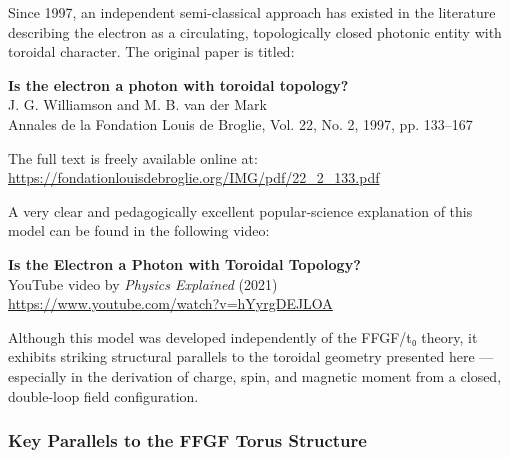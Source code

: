 Since 1997, an independent semi-classical approach has existed in the literature describing the electron as a circulating, topologically closed photonic entity with toroidal character. The original paper is titled:

\begin{center}
	\textbf{Is the electron a photon with toroidal topology?} \\
	J. G. Williamson and M. B. van der Mark \\
	Annales de la Fondation Louis de Broglie, Vol. 22, No. 2, 1997, pp. 133--167
\end{center}

The full text is freely available online at: \\
\url{https://fondationlouisdebroglie.org/IMG/pdf/22_2_133.pdf}

A very clear and pedagogically excellent popular-science explanation of this model can be found in the following video:

\begin{center}
	\textbf{Is the Electron a Photon with Toroidal Topology?} \\
	YouTube video by \emph{Physics Explained} (2021) \\
	\url{https://www.youtube.com/watch?v=hYyrgDEJLOA}
\end{center}

Although this model was developed independently of the FFGF/t₀ theory, it exhibits striking structural parallels to the toroidal geometry presented here — especially in the derivation of charge, spin, and magnetic moment from a closed, double-loop field configuration.

\subsubsection{Key Parallels to the FFGF Torus Structure}

